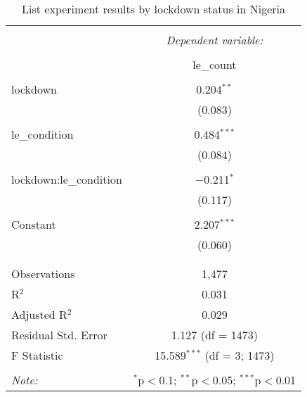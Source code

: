
\begin{table}[!htbp] \centering 
  \caption{List experiment results by lockdown status in Nigeria} 
  \label{tab:list_nig} 
\begin{tabular}{@{\extracolsep{5pt}}lc} 
\\[-1.8ex]\hline 
\hline \\[-1.8ex] 
 & \multicolumn{1}{c}{\textit{Dependent variable:}} \\ 
\cline{2-2} 
\\[-1.8ex] & le\_count \\ 
\hline \\[-1.8ex] 
 lockdown & 0.204$^{**}$ \\ 
  & (0.083) \\ 
  & \\ 
 le\_condition & 0.484$^{***}$ \\ 
  & (0.084) \\ 
  & \\ 
 lockdown:le\_condition & $-$0.211$^{*}$ \\ 
  & (0.117) \\ 
  & \\ 
 Constant & 2.207$^{***}$ \\ 
  & (0.060) \\ 
  & \\ 
\hline \\[-1.8ex] 
Observations & 1,477 \\ 
R$^{2}$ & 0.031 \\ 
Adjusted R$^{2}$ & 0.029 \\ 
Residual Std. Error & 1.127 (df = 1473) \\ 
F Statistic & 15.589$^{***}$ (df = 3; 1473) \\ 
\hline 
\hline \\[-1.8ex] 
\textit{Note:}  & \multicolumn{1}{r}{$^{*}$p$<$0.1; $^{**}$p$<$0.05; $^{***}$p$<$0.01} \\ 
\end{tabular} 
\end{table} 
